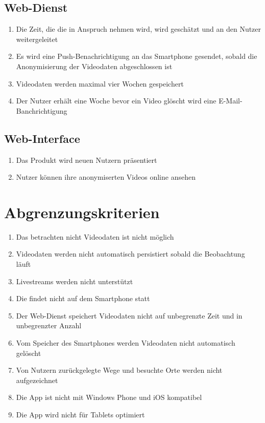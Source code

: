\subsection{Web-Dienst}
	\begin{enumerate}
	\renewcommand{\labelenumi}{\textbf{\theenumi}}
	\renewcommand{\theenumi}{WK\arabic{enumi}0}
	\setcounter{enumi}{199}
	\item Die Zeit, die die  in Anspruch nehmen wird, wird geschätzt und an den Nutzer weitergeleitet
	\item Es wird eine Push-Benachrichtigung an das \gls{Smartphone} gesendet, sobald die Anonymisierung der Videodaten abgeschlossen ist
	\item Videodaten werden maximal vier Wochen gespeichert
	\item Der Nutzer erhält eine Woche bevor ein Video glöscht wird eine \gls{E-Mail}-Banchrichtigung
	\end{enumerate}
\subsection{Web-Interface}
	\begin{enumerate}
	\renewcommand{\labelenumi}{\textbf{\theenumi}}
	\renewcommand{\theenumi}{WK\arabic{enumi}0}
	\setcounter{enumi}{299}
	\item Das Produkt wird neuen Nutzern präsentiert
	\item Nutzer können ihre anonymiserten Videos online ansehen
	\end{enumerate}

\section{Abgrenzungskriterien}
	\begin{enumerate}
	\renewcommand{\labelenumi}{\textbf{\theenumi}}
	\renewcommand{\theenumi}{AK\arabic{enumi}0}
	\item Das betrachten nicht  Videodaten ist nicht möglich
	\item Videodaten werden nicht automatisch persistiert sobald die Beobachtung läuft
	\item \glspl{Livestream} werden nicht unterstützt
	\item Die  findet nicht auf dem \gls{Smartphone} statt
	\item Der \gls{Web-Dienst} speichert Videodaten nicht auf unbegrenzte Zeit und in unbegrenzter Anzahl
	\item Vom Speicher des Smartphones werden Videodaten nicht automatisch gelöscht
	\item Von Nutzern zurückgelegte Wege und besuchte Orte werden nicht aufgezeichnet
	\item Die \gls{App} ist nicht mit Windows Phone und iOS kompatibel
	\item Die \gls{App} wird nicht für Tablets optimiert
	\end{enumerate}